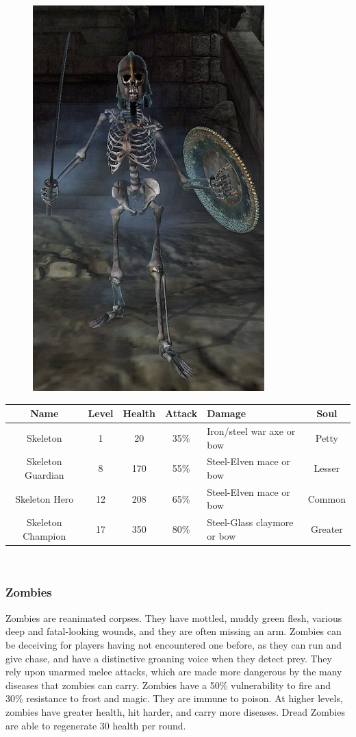 \documentclass[12pt]{book}
\begin{document}
\begin{figure}[h]
	\centering
	\includegraphics[scale=1]{skeleton.png}
\end{figure}

\begin{tabular}{|c|c|c|c|p{}|c|}
\hline
Name & Level & Health & Attack & Damage & Soul\\ \hline
Skeleton & 1 & 20 & 35\% & Iron/steel war axe or bow & Petty\\ \hline
Skeleton Guardian & 8 & 170 & 55\% & Steel-Elven mace or bow & Lesser\\ \hline
Skeleton Hero & 12 & 208 & 65\% & Steel-Elven mace or bow & Common\\ \hline
Skeleton Champion & 17 & 350 & 80\% & Steel-Glass claymore or bow & Greater\\ \hline
\end{tabular}\\

\subsubsection{Zombies}
Zombies are reanimated corpses. They have mottled, muddy green flesh, various deep and fatal-looking wounds, and they are often missing an arm. Zombies can be deceiving for players having not encountered one before, as they can run and give chase, and have a distinctive groaning voice when they detect prey. They rely upon unarmed melee attacks, which are made more dangerous by the many diseases that zombies can carry. Zombies have a 50\% vulnerability to fire and 30\% resistance to frost and magic. They are immune to poison. At higher levels, zombies have greater health, hit harder, and carry more diseases. Dread Zombies are able to regenerate 30 health per round.
\end{document}
